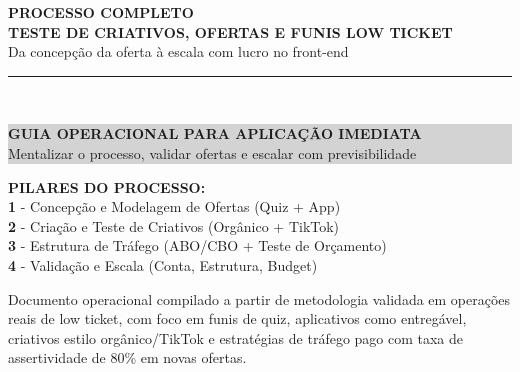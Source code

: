 \documentclass[12pt, a4paper]{article}
\begin{document}
\begin{titlepage}
    \centering
    \vspace*{2.5cm}
    {\Huge \textbf{\textcolor{primaryColor}{PROCESSO COMPLETO}}} \\
    \vspace{0.5cm}
    {\Large \textbf{TESTE DE CRIATIVOS, OFERTAS E FUNIS LOW TICKET}} \\
    \vspace{0.3cm}
    {\large Da concepção da oferta à escala com lucro no front-end} \\
    \vspace{1.5cm}
    \rule{10cm}{1.5pt} \\
    \vspace{0.5cm}
    \colorbox{lightGray}{%
        \parbox{0.9\textwidth}{%
            \centering
            \vspace{0.3cm}
            {\Large \textbf{GUIA OPERACIONAL PARA APLICAÇÃO IMEDIATA}} \\
            \vspace{0.3cm}
            {\large Mentalizar o processo, validar ofertas e escalar com previsibilidade} \\
            \vspace{0.3cm}
        }%
    }
    \vspace{1.5cm}

    \begin{flushleft}
    \textbf{PILARES DO PROCESSO:} \\
    \vspace{0.2cm}
    \textcolor{primaryColor}{\textbf{1}} - Concepção e Modelagem de Ofertas (Quiz + App) \\
    \textcolor{primaryColor}{\textbf{2}} - Criação e Teste de Criativos (Orgânico + TikTok) \\
    \textcolor{primaryColor}{\textbf{3}} - Estrutura de Tráfego (ABO/CBO + Teste de Orçamento) \\
    \textcolor{primaryColor}{\textbf{4}} - Validação e Escala (Conta, Estrutura, Budget)
    \end{flushleft}

    \vfill
    {\small Documento operacional compilado a partir de metodologia validada em operações reais de low ticket, com foco em funis de quiz, aplicativos como entregável, criativos estilo orgânico/TikTok e estratégias de tráfego pago com taxa de assertividade de 80\% em novas ofertas.} \\
    \vspace{1.5cm}


\end{titlepage}
\end{document}
